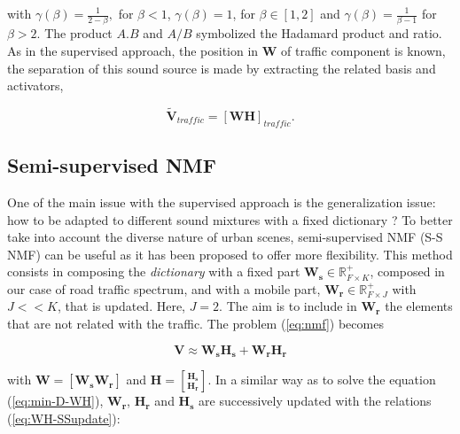 \documentclass[twocolumn,a4paper,10pt]{article}
\begin{document}
with $\gamma(\beta) = \frac{1}{2-\beta},$ for $\beta < 1$, $ \gamma(\beta) = 1$, for $\beta \in \left[1,2\right]$ and $\gamma(\beta) = \frac{1}{\beta-1}$ for $\beta > 2$. The product $A.B$ and $A/B$ symbolized the Hadamard product and ratio. As in the supervised approach, the position in $\mathbf{W}$ of traffic component is known, the separation of this sound source is made by extracting the related basis and activators,

\begin{equation}\label{eq:separationExtraction}
\mathbf{\tilde{V}}_{traffic} = \left[ \mathbf{WH} \right]_{traffic}.
\end{equation}

\subsection{Semi-supervised NMF}

One of the main issue with the supervised approach is the generalization issue: how to be adapted to different sound mixtures with a fixed dictionary ? To better take into account the diverse nature of urban scenes, semi-supervised NMF (S-S NMF)\cite{lee_semi-supervised_2010} can be useful as it has been proposed  to offer more flexibility. This method consists in composing the \textit{dictionary} with a fixed part $\mathbf{W_s} \in \mathbb{R}^+_{F\times K}$, composed in our case of road traffic spectrum, and with a mobile part, $\mathbf{W_r} \in \mathbb{R}^+_{F\times J}$ with $J <<K$, that is updated. Here, $J = 2$. The aim is to include in $\mathbf{W_r}$ the elements that are not related with the traffic. The problem (\ref{eq:nmf}) becomes

\begin{equation}
\mathbf{V} \approx \mathbf{W_s H_s}+ \mathbf{W_r H_r}
\end{equation}

 with $\mathbf{W} = \left[\mathbf{W_s} \mathbf{W_r} \right]$ and $\mathbf{H} = \genfrac[]{0pt}{0}{\mathbf{H_s}}{\mathbf{H_r}}$. In a similar way as to solve the equation (\ref{eq:min-D-WH}), $\mathbf{W_r}$, $\mathbf{H_r}$ and $\mathbf{H_s}$ are successively updated with the relations (\ref{eq:WH-SSupdate}):
\end{document}
